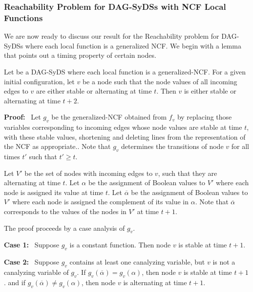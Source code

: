 \medskip

\noindent
\subsubsection{Reachability Problem for DAG-SyDSs with NCF Local Functions}

\medskip

We are now ready to discuss our result for the Reachability problem
for DAG-SyDSs where each local function is a generalized NCF.
We begin with a lemma that points out a timing property of certain nodes.

\begin{lemma}\label{lem:ncf_plus_two}
Let \cals{} be a DAG-SyDS where each local function is a generalized-NCF.
For a given initial configuration,
let $v$ be a node such that the node values of all incoming edges to $v$
are  either stable or alternating at time $t$.
Then  $v$ is either stable or alternating at time $t+2$.
\end{lemma}

\medskip

\noindent
\textbf{Proof:}~ Let $g_v$ be the generalized-NCF obtained from
$f_v$ by replacing those variables corresponding to incoming edges
whose node values are stable at time $t$, with these stable values,
shortening and deleting lines from the representation of the NCF
as appropriate..  Note that $g_v$ determines the transitions of
node $v$ for all times $t'$ such that $t' \geq t$.

Let $V'$ be the set of nodes with incoming edges to $v$, such that
they are alternating at time $t$.  Let $\alpha$  be the assignment
of Boolean values to $V'$ where each node  is assigned its value
at time $t$.  Let $\overline{\alpha}$  be the assignment of Boolean
values to $V'$ where each node  is assigned the complement of its
value in $\alpha$.  Note that $\overline{\alpha}$ corresponds to
the values of the nodes in $V'$ at time $t+1$.

The proof proceeds by a case analysis of $g_v$.

\medskip

\noindent
\textbf{Case 1:}~ Suppose $g_v$ is a constant function.
Then node $v$ is stable at time $t+1$.

\medskip

\noindent
\textbf{Case 2:}~ Suppose $g_v$ contains at least one canalyzing variable, 
but $v$ is not a canalyzing variable of $g_v$.
If $g_v(\overline{\alpha}) = g_v(\alpha)$, then node $v$ is stable at time $t+1$.
and if $g_v(\overline{\alpha}) \neq g_v(\alpha)$, 
then node $v$ is alternating at time $t+1$.

